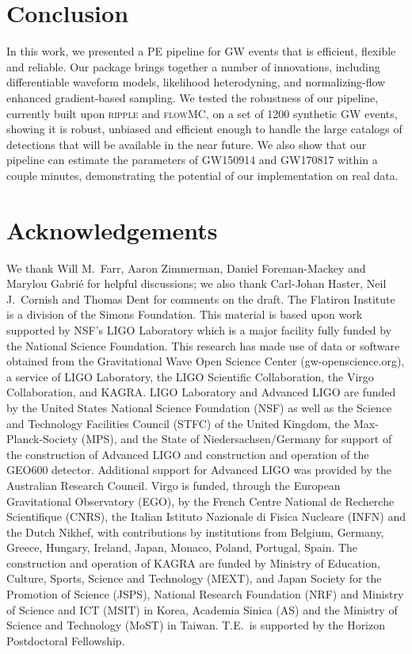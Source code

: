\documentclass[twocolumn]{aastex631}
\begin{document}
\section{Conclusion}

In this work, we presented a PE pipeline for GW events that is efficient,
flexible and reliable. Our package brings together a number of innovations,
including differentiable waveform models, likelihood heterodyning, and
normalizing-flow enhanced gradient-based sampling. We tested the robustness of
our pipeline, currently built upon \textsc{ripple} and \textsc{flowMC}, on a
set of 1200 synthetic GW events, showing it is robust, unbiased and efficient
enough to handle the large catalogs of detections that will be available in the
near future. We also show that our pipeline can estimate the parameters of
GW150914 and GW170817 within a couple minutes, demonstrating the potential of our
implementation on real data.

\section{Acknowledgements}
We thank Will M.~Farr, Aaron Zimmerman, Daniel Foreman-Mackey and Marylou Gabri\'e for helpful discussions; we also thank Carl-Johan Haster, Neil J.~Cornish and Thomas Dent for comments on the draft.
The Flatiron Institute is a division of the Simons Foundation.
This material is based upon work supported by NSF's LIGO Laboratory which is a major facility fully funded by the National Science Foundation.
This research has made use of data or software obtained from the Gravitational Wave Open Science Center (gw-openscience.org), a service of LIGO Laboratory, the LIGO Scientific Collaboration, the Virgo Collaboration, and KAGRA. LIGO Laboratory and Advanced LIGO are funded by the United States National Science Foundation (NSF) as well as the Science and Technology Facilities Council (STFC) of the United Kingdom, the Max-Planck-Society (MPS), and the State of Niedersachsen/Germany for support of the construction of Advanced LIGO and construction and operation of the GEO600 detector. Additional support for Advanced LIGO was provided by the Australian Research Council. Virgo is funded, through the European Gravitational Observatory (EGO), by the French Centre National de Recherche Scientifique (CNRS), the Italian Istituto Nazionale di Fisica Nucleare (INFN) and the Dutch Nikhef, with contributions by institutions from Belgium, Germany, Greece, Hungary, Ireland, Japan, Monaco, Poland, Portugal, Spain. The construction and operation of KAGRA are funded by Ministry of Education, Culture, Sports, Science and Technology (MEXT), and Japan Society for the Promotion of Science (JSPS), National Research Foundation (NRF) and Ministry of Science and ICT (MSIT) in Korea, Academia Sinica (AS) and the Ministry of Science and Technology (MoST) in Taiwan.
T.E.\ is supported by the Horizon Postdoctoral Fellowship.


\end{document}

